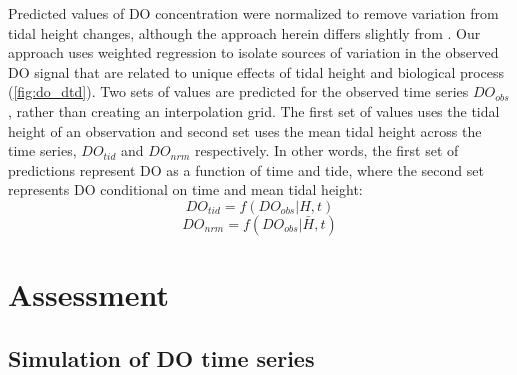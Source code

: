 \documentclass[letterpaper,12pt,oneside]{article}\usepackage[]{graphicx}\usepackage[]{color}
\begin{document}
Predicted values of \ac{DO} concentration were normalized to remove variation from tidal height changes, although the approach herein differs slightly from \citet{Hirsch10}.  Our approach uses weighted regression to isolate sources of variation in the observed \ac{DO} signal that are related to unique effects of tidal height and biological process (\cref{fig:do_dtd}).  Two sets of values are predicted for the observed time series $DO_{obs}$, rather than creating an interpolation grid.  The first set of values uses the tidal height of an observation and second set uses the mean tidal height across the time series, $DO_{tid}$ and $DO_{nrm}$ respectively.  In other words, the first set of predictions represent \ac{DO} as a function of time and tide, where the second set represents \ac{DO} conditional on time and mean tidal height:
\begin{equation} \label{do_tid}
DO_{tid} = f(DO_{obs}|H, t)
\end{equation}
\begin{equation} \label{do_nrm}
DO_{nrm} = f(DO_{obs}|\bar{H}, t)
\end{equation}

\section{Assessment}

\subsection{Simulation of \ac{DO} time series}
\end{document}

